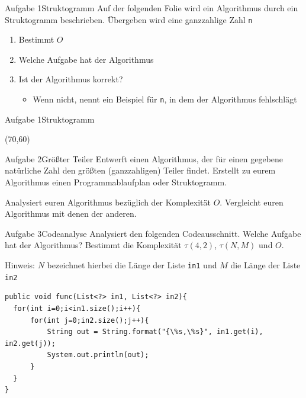 \begin{frame}{Aufgabe 1}{Struktogramm}
Auf der folgenden Folie wird ein Algorithmus durch ein Struktogramm beschrieben. Übergeben wird eine ganzzahlige Zahl \texttt{n}
\begin{enumerate}
    \item Bestimmt $O$
    \item Welche Aufgabe hat der Algorithmus
    \item Ist der Algorithmus korrekt?
    \begin{itemize}
        \item Wenn nicht, nennt ein Beispiel für \texttt{n}, in dem der Algorithmus fehlschlägt
    \end{itemize}
\end{enumerate}
\end{frame}

\begin{frame}{Aufgabe 1}{Struktogramm}
\begin{centernss}
    \begin{struktogramm}(70,60)
        \untilend
    \end{struktogramm}
\end{centernss}
\end{frame}

\begin{frame}{Aufgabe 2}{Größter Teiler}
Entwerft einen Algorithmus, der für einen gegebene natürliche Zahl den größten (ganzzahligen) Teiler findet. Erstellt zu eurem Algorithmus einen Programmablaufplan oder Struktogramm.

Analysiert euren Algorithmus bezüglich der Komplexität $O$. Vergleicht euren Algorithmus mit denen der anderen.
\end{frame}

\begin{frame}[fragile]{Aufgabe 3}{Codeanalyse}
Analysiert den folgenden Codeausschnitt. Welche Aufgabe hat der Algorithmus? Bestimmt die Komplexität $\tau(4,2)$, $\tau(N,M)$ und $O$.

Hinweis: $N$ bezeichnet hierbei die Länge der Liste \texttt{in1} und $M$ die Länge der Liste \texttt{in2}

\lstset{style=java}
\begin{lstlisting}
public void func(List<?> in1, List<?> in2){
  for(int i=0;i<in1.size();i++){
      for(int j=0;in2.size();j++){
          String out = String.format("{\%s,\%s}", in1.get(i), in2.get(j));
          System.out.println(out);
      }
  }
}
\end{lstlisting}
\end{frame}

